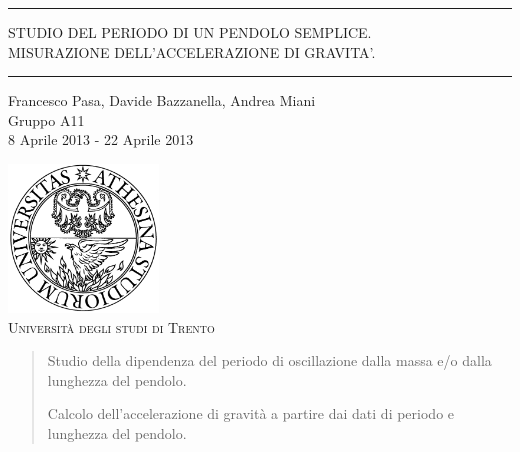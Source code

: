 \begin{titlepage}
\begin{center}

	\hrule \vspace{0.5cm}
     	\textsc{\LARGE STUDIO DEL PERIODO DI UN PENDOLO SEMPLICE.\\}
     	\vspace{0.4cm}
     	\textsc{\LARGE MISURAZIONE DELL'ACCELERAZIONE DI GRAVITA'.}
	\vspace{0.5cm} \hrule \vspace{2cm}

      	{\large Francesco Pasa, Davide Bazzanella, Andrea Miani\\
		Gruppo A11}\\
	\vspace{0.5cm}
      	{\large 8 Aprile 2013 - 22 Aprile 2013}
	\vfill

	\includegraphics[width=4cm]{unitn_logo.png}\\
	\vspace{1cm}
        \textsc{\Large Università degli studi di Trento}
	\vfill

	{\begin{abstract}
Studio della dipendenza del periodo di oscillazione dalla massa e/o dalla lunghezza del pendolo.

Calcolo dell'accelerazione di gravità a partire dai dati di periodo e lunghezza del pendolo.
	 \end{abstract}}
\end{center}
\end{titlepage}
